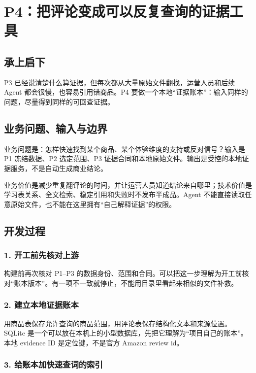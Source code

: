 \chapter{P4：把评论变成可以反复查询的证据工具}

\section{承上启下}

P3 已经说清楚什么算证据，但每次都从大量原始文件翻找，运营人员和后续 Agent 都会很慢，也容易引用错商品。P4 要做一个本地“证据账本”：输入同样的问题，尽量得到同样的可回查证据。

\section{业务问题、输入与边界}

业务问题是：怎样快速找到某个商品、某个体验维度的支持或反对信号？输入是 P1 冻结数据、P2 选定范围、P3 证据合同和本地原始文件。输出是受控的本地证据服务，不是自动生成商业结论。

业务价值是减少重复翻评论的时间，并让运营人员知道结论来自哪里；技术价值是学习表关系、全文检索、稳定引用和失败时不发布半成品。Agent 不能直接读取任意原始文件，也不能在这里拥有“自己解释证据”的权限。

\section{开发过程}

\subsection{1. 开工前先核对上游}

构建前再次核对 P1--P3 的数据身份、范围和合同。可以把这一步理解为开工前核对“账本版本”。有一项不一致就停止，不能用目录里看起来相似的文件补救。

\subsection{2. 建立本地证据账本}

用商品表保存允许查询的商品范围，用评论表保存结构化文本和来源位置。SQLite 是一个可以放在本机上的小型数据库，先把它理解为“项目自己的账本”。本地 evidence ID 是定位键，不是官方 Amazon review id。

\subsection{3. 给账本加快速查词的索引}

